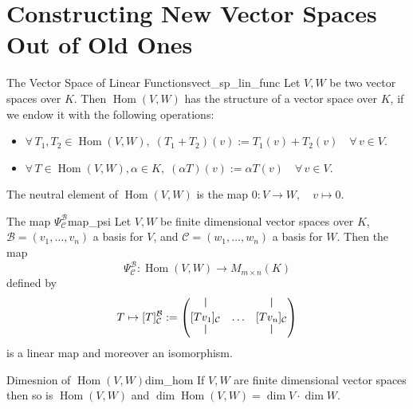 % 
%
%
%

\section{Constructing New Vector Spaces Out of Old Ones}

\begin{proposition}{The Vector Space of Linear Functions}{vect_sp_lin_func}
	Let $V, W$ be two vector spaces over $K$. Then $\operatorname{Hom}(V, W)$ has the structure of a vector space over $K$, if we endow it with the following operations:
	\begin{itemize}
		\item[$\bullet$] $\forall \, T_1,T_2 \in \operatorname{Hom}(V, W), \; (T_1 + T_2)(v) := T_1(v) + T_2(v) \quad \forall \, v \in V$.
		\item[$\bullet$] $\forall \, T \in \operatorname{Hom}(V, W), \alpha \in K, \; (\alpha T)(v) := \alpha T(v) \quad \forall \, v \in V$.
	\end{itemize}
	The neutral element of $\operatorname{Hom}(V, W)$ is the map $0: V\to W, \quad v \mapsto 0$.
\end{proposition}

\begin{theorem}{The map $\Psi^{\mathcal{B}}_{\mathcal{C}}$}{map_psi}
	Let $V, W$ be finite dimensional vector spaces over $K$, $\mathcal{B} = (v_1 , \hdots , v_n)$ a basis for $V$, and $\mathcal{C} = (w_1, \hdots , w_n)$ a basis for $W$. Then the map
	\[
		\Psi^{\mathcal{B}}_{\mathcal{C}}: \operatorname{Hom}(V, W) \to M_{m \times n}(K)
	\]
	defined by
	\[
		T \mapsto [T]^{\mathcal{B}}_{\mathcal{C}} := \begin{pmatrix}
			\rule{0.5pt}{2ex} & & \rule{0.5pt}{2ex}\\
			[Tv_1]_{\mathcal{C}} & \hdots & [Tv_n]_{\mathcal{C}}\\
			\rule{0.5pt}{2ex} & & \rule{0.5pt}{2ex}\\
		\end{pmatrix}
	\]
	is a linear map and moreover an isomorphism.
\end{theorem}

\begin{corollary}{Dimesnion of $\operatorname{Hom}(V, W)$}{dim_hom}
	If $V, W$ are finite dimensional vector spaces then so is $\operatorname{Hom}(V, W)$ and $\dim \operatorname{Hom}(V, W) = \dim V \cdot \dim W$.
\end{corollary}

